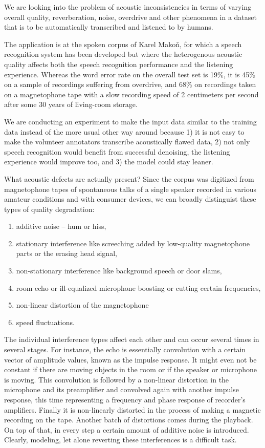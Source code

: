 \documentclass[conference]{IEEEtran}
\begin{document}
We are looking into the problem of acoustic inconsistencies in terms of varying
overall quality, reverberation, noise, overdrive and other phenomena in a
dataset that is to be automatically transcribed and listened to by humans.

The application is at the spoken corpus of Karel Makoň\cite{makondata}, for which
a speech recognition system has been developed\cite{kruuza2012making} but where
the heterogenous acoustic quality affects both the speech recognition
performance and the listening experience. Whereas the word error rate on the
overall test set is 19\%, it is 45\% on a sample of recordings suffering from
overdrive, and 68\% on recordings taken on a magnetophone tape with a slow
recording speed of 2 centimeters per second after some 30 years of living-room
storage.

We are conducting an experiment to make the input data similar to the training
data instead of the more usual other way around because 1) it is not easy to
make the volunteer annotators transcribe acoustically flawed data, 2) not only
speech recognition would benefit from successful denoising, the listening
experience would improve too, and 3) the model could stay leaner.

What acoustic defects are actually present? Since the corpus was digitized from
magnetophone tapes of spontaneous talks of a single speaker recorded in various
amateur conditions and with consumer devices, we can broadly distinguist these
types of quality degradation:
\begin{enumerate}
\item{additive noise -- hum or hiss,}
\item{
    stationary interference like screeching added by low-quality magnetophone
    parts or the erasing head signal,
}
\item{non-stationary interference like background speech or door slams,}
\item{
    room echo or ill-equalized microphone boosting or cutting certain
    frequencies,
}
\item{non-linear distortion of the magnetophone}
\item{speed fluctuations.}
\end{enumerate}

The individual interference types affect each other and can occur several times
in several stages. For instance, the echo is essentially convolution with a certain vector of
amplitude values, known as the impulse response. It might even not be
constant if there are moving objects in the room or if the speaker or
microphone is moving. This convolution is followed by a non-linear
distortion in the microphone and its preamplifier and convolved again with
another impulse response, this time representing a frequency and phase
response of recorder's amplifiers. Finally it is non-linearly distorted in
the process of making a magnetic recording on the tape. Another batch of
distortions comes during the playback. On top of that, in every step a certain
amount of additive noise is introduced. Clearly, modeling, let alone reverting these
interferences is a difficult task.
\end{document}
